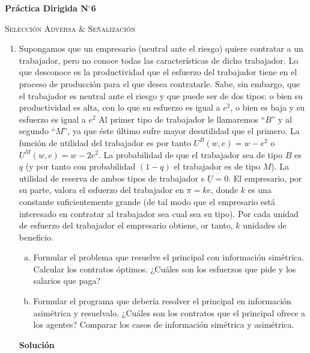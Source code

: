 \documentclass[10pt,a4paper]{article}
\begin{document}
	\begin{center}
		{\Large {\textbf{Práctica Dirigida N$^{\circ}$6}}}

		\textsc{Selección Adversa \& Señalización}
		
	\end{center}
\begin{enumerate}
	\item Supongamos que un empresario (neutral ante el riesgo) quiere contratar a un trabajador, pero no conoce todas las características de dicho trabajador. Lo que desconoce es la productividad que el esfuerzo del trabajador tiene en el proceso de producción para el que desea contratarle. Sabe, sin embargo, que el trabajador es neutral ante el riesgo y que puede ser de dos tipos: o bien su productividad es alta, con lo que su esfuerzo es igual a $e^{2}$, o bien es baja y su esfuerzo es igual a $e^{2}$
	Al primer tipo de trabajador le llamaremos  ``$B$'' y al segundo ``$M$'', ya que éste último sufre mayor desutilidad que el primero. La función de utilidad del trabajador es por tanto $U^{B}(w, e)=w-e^{2}$ o $U^{M}(w, e)=w-2e^{2}$. La probabilidad de que el trabajador sea de tipo $B$ es $q$ (y por tanto con probabilidad $(1-q)$ el trabajador es de tipo $M$). La utilidad de reserva de ambos tipos de trabajador s $\underline{U}=0 .$ El empresario, por su parte, valora el esfuerzo del trabajador en $\pi=ke$, donde $k$ es una constante suficientemente grande (de tal modo que el empresario está interesado en contratar al trabajador sea cual sea su tipo). Por cada unidad de esfuerzo del trabajador el empresario obtiene, or tanto, $k$ unidades de beneficio.
		\begin{enumerate}[a)]
			\item Formular el problema que resuelve el principal con información simétrica. Calcular los contratos óptimos. ¿Cuáles son los esfuerzos que pide y los salarios que paga?
			\item Formular el programa que debería resolver el principal en información asimétrica y resuelvalo. ¿Cuáles son los contratos que el principal ofrece a los agentes? Comparar los casos de información simétrica y asimétrica.
		\end{enumerate}
		\textbf{\LARGE Solución}\\
			
	

\end{enumerate}
\end{document}
